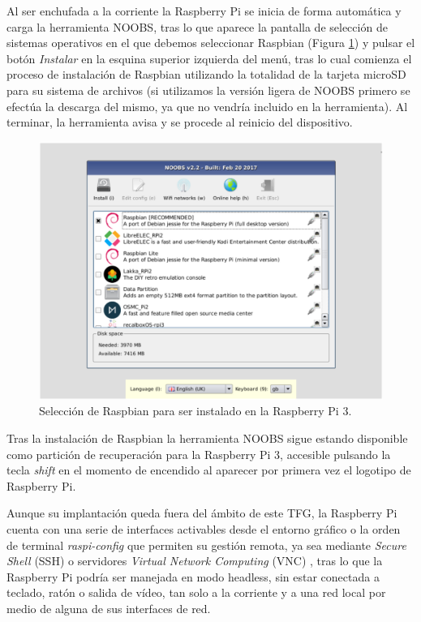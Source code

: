 \begin{appendices}
Al ser enchufada a la corriente la Raspberry Pi se inicia de forma automática y carga la herramienta NOOBS, tras lo que aparece la pantalla de selección de sistemas operativos en el que debemos seleccionar Raspbian (Figura \ref{NOOBS}) y pulsar el botón \emph{Instalar} en la esquina superior izquierda del menú, tras lo cual comienza el proceso de instalación de Raspbian utilizando la totalidad de la tarjeta microSD para su sistema de archivos (si utilizamos la versión ligera de NOOBS primero se efectúa la descarga del mismo, ya que no vendría incluido en la herramienta). Al terminar, la herramienta avisa y se procede al reinicio del dispositivo.

\begin{figure}[!t]
\begin{center}
\includegraphics[width=0.75\linewidth]{./X_Anexos/Img/NOOBS.png}
\end{center}
\caption{Selección de Raspbian para ser instalado en la Raspberry Pi 3.}
\label{NOOBS}
\end{figure}

Tras la instalación de Raspbian la herramienta NOOBS sigue estando disponible como partición de recuperación para la Raspberry Pi 3, accesible pulsando la tecla \emph{shift} en el momento de encendido al aparecer por primera vez el logotipo de Raspberry Pi.

Aunque su implantación queda fuera del ámbito de este TFG, la Raspberry Pi cuenta con una serie de interfaces activables desde el entorno gráfico o la orden de terminal \emph{raspi-config} que permiten su gestión remota, ya sea mediante \emph{Secure Shell} (\acrshort{SSH}) o servidores \emph{Virtual Network Computing} (\acrshort{VNC}) \cite{RasPiVNC}, tras lo que la Raspberry Pi podría ser manejada en modo headless, sin estar conectada a teclado, ratón o salida de vídeo, tan solo a la corriente y a una red local por medio de alguna de sus interfaces de red.


\end{appendices}
